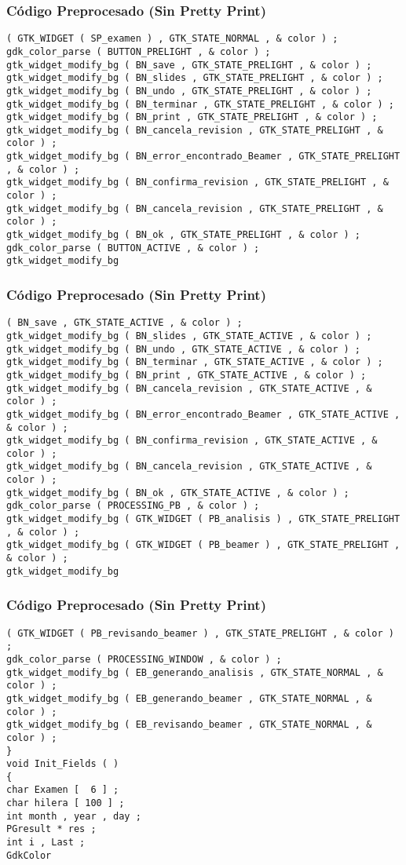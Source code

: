 \documentclass{beamer}
\begin{document}
\begin{frame}[fragile]
\frametitle{C\'odigo Preprocesado (Sin Pretty Print)}
\begin{lstlisting}[style=CStyle]
( GTK_WIDGET ( SP_examen ) , GTK_STATE_NORMAL , & color ) ; 
gdk_color_parse ( BUTTON_PRELIGHT , & color ) ; 
gtk_widget_modify_bg ( BN_save , GTK_STATE_PRELIGHT , & color ) ; 
gtk_widget_modify_bg ( BN_slides , GTK_STATE_PRELIGHT , & color ) ; 
gtk_widget_modify_bg ( BN_undo , GTK_STATE_PRELIGHT , & color ) ; 
gtk_widget_modify_bg ( BN_terminar , GTK_STATE_PRELIGHT , & color ) ; 
gtk_widget_modify_bg ( BN_print , GTK_STATE_PRELIGHT , & color ) ; 
gtk_widget_modify_bg ( BN_cancela_revision , GTK_STATE_PRELIGHT , & color ) ; 
gtk_widget_modify_bg ( BN_error_encontrado_Beamer , GTK_STATE_PRELIGHT , & color ) ; 
gtk_widget_modify_bg ( BN_confirma_revision , GTK_STATE_PRELIGHT , & color ) ; 
gtk_widget_modify_bg ( BN_cancela_revision , GTK_STATE_PRELIGHT , & color ) ; 
gtk_widget_modify_bg ( BN_ok , GTK_STATE_PRELIGHT , & color ) ; 
gdk_color_parse ( BUTTON_ACTIVE , & color ) ; 
gtk_widget_modify_bg \end{lstlisting}
\end{frame}
\begin{frame}[fragile]
\frametitle{C\'odigo Preprocesado (Sin Pretty Print)}
\begin{lstlisting}[style=CStyle]
( BN_save , GTK_STATE_ACTIVE , & color ) ; 
gtk_widget_modify_bg ( BN_slides , GTK_STATE_ACTIVE , & color ) ; 
gtk_widget_modify_bg ( BN_undo , GTK_STATE_ACTIVE , & color ) ; 
gtk_widget_modify_bg ( BN_terminar , GTK_STATE_ACTIVE , & color ) ; 
gtk_widget_modify_bg ( BN_print , GTK_STATE_ACTIVE , & color ) ; 
gtk_widget_modify_bg ( BN_cancela_revision , GTK_STATE_ACTIVE , & color ) ; 
gtk_widget_modify_bg ( BN_error_encontrado_Beamer , GTK_STATE_ACTIVE , & color ) ; 
gtk_widget_modify_bg ( BN_confirma_revision , GTK_STATE_ACTIVE , & color ) ; 
gtk_widget_modify_bg ( BN_cancela_revision , GTK_STATE_ACTIVE , & color ) ; 
gtk_widget_modify_bg ( BN_ok , GTK_STATE_ACTIVE , & color ) ; 
gdk_color_parse ( PROCESSING_PB , & color ) ; 
gtk_widget_modify_bg ( GTK_WIDGET ( PB_analisis ) , GTK_STATE_PRELIGHT , & color ) ; 
gtk_widget_modify_bg ( GTK_WIDGET ( PB_beamer ) , GTK_STATE_PRELIGHT , & color ) ; 
gtk_widget_modify_bg \end{lstlisting}
\end{frame}
\begin{frame}[fragile]
\frametitle{C\'odigo Preprocesado (Sin Pretty Print)}
\begin{lstlisting}[style=CStyle]
( GTK_WIDGET ( PB_revisando_beamer ) , GTK_STATE_PRELIGHT , & color ) ; 
gdk_color_parse ( PROCESSING_WINDOW , & color ) ; 
gtk_widget_modify_bg ( EB_generando_analisis , GTK_STATE_NORMAL , & color ) ; 
gtk_widget_modify_bg ( EB_generando_beamer , GTK_STATE_NORMAL , & color ) ; 
gtk_widget_modify_bg ( EB_revisando_beamer , GTK_STATE_NORMAL , & color ) ; 
} 
void Init_Fields ( ) 
{ 
char Examen [  6 ] ; 
char hilera [ 100 ] ; 
int month , year , day ; 
PGresult * res ; 
int i , Last ; 
GdkColor \end{lstlisting}
\end{frame}
\end{document}
